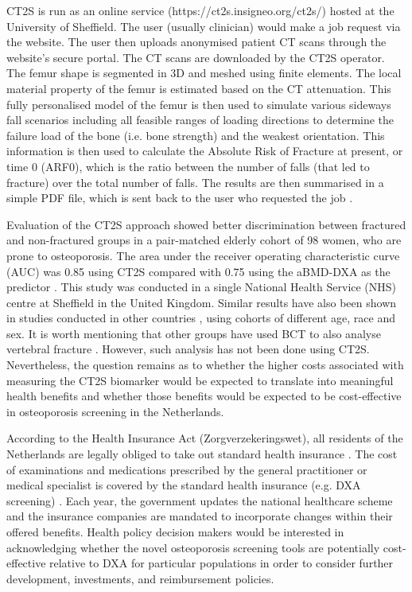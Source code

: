  CT2S is run as an online service (https://ct2s.insigneo.org/ct2s/) hosted at the University of Sheffield. The user (usually clinician) would make a job request via the website. The user then uploads anonymised patient CT scans through the website’s secure portal. The CT scans are downloaded by the CT2S operator. The femur shape is segmented in 3D and meshed using finite elements. The local material property of the femur is estimated based on the CT attenuation. This fully personalised model of the femur is then used to simulate various sideways fall scenarios including all feasible ranges of loading directions to determine the failure load of the bone (i.e. bone strength) and the weakest orientation. This information is then used to calculate the Absolute Risk of Fracture at present, or time 0 (ARF0), which is the ratio between the number of falls (that led to fracture) over the total number of falls. The results are then summarised in a simple PDF file, which is sent back to the user who requested the job \cite{4-8}.

Evaluation of the CT2S approach showed better discrimination between fractured and non-fractured groups in a pair-matched elderly cohort of 98 women, who are prone to osteoporosis. The area under the receiver operating characteristic curve (AUC) was 0.85 using CT2S compared with 0.75 using the aBMD-DXA as the predictor \cite{4-3,4-6,4-7}. This study was conducted in a single National Health Service (NHS) centre at Sheffield in the United Kingdom. Similar results have also been shown in studies conducted in other countries \cite{4-9}, using cohorts of different age, race and sex. It is worth mentioning that other groups have used BCT to also analyse vertebral fracture \cite{4-9}.  However, such analysis has not been done using CT2S. Nevertheless, the question remains as to whether the higher costs associated with measuring the CT2S biomarker would be expected to translate into meaningful health benefits and whether those benefits would be expected to be cost-effective in osteoporosis screening in the Netherlands.

According to the Health Insurance Act (Zorgverzekeringswet), all residents of the Netherlands are legally obliged to take out standard health insurance \cite{4-10}. The cost of examinations and medications prescribed by the general practitioner or medical specialist is covered by the standard health insurance (e.g. DXA screening) \cite{4-11}. Each year, the government updates the national healthcare scheme and the insurance companies are mandated to incorporate changes within their offered benefits. Health policy decision makers would be interested in acknowledging whether the novel osteoporosis screening tools are potentially cost-effective relative to DXA for particular populations in order to consider further development, investments, and reimbursement policies. 

